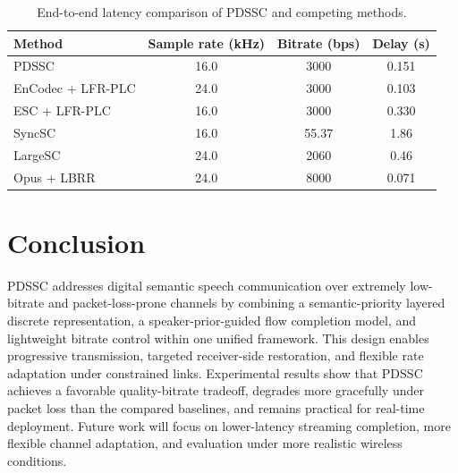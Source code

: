 \documentclass[conference]{IEEEtran}
\begin{document}
\begin{table}[!t]
\caption{End-to-end latency comparison of PDSSC and competing methods.}
\label{tab:latency}
\centering
\begin{tabular}{lccc}
\hline
Method & Sample rate (kHz) & Bitrate (bps) & Delay (s) \\
\hline
PDSSC & 16.0 & 3000 & 0.151 \\
EnCodec + LFR-PLC & 24.0 & 3000 & 0.103 \\
ESC + LFR-PLC & 16.0 & 3000 & 0.330 \\
SyncSC & 16.0 & 55.37 & 1.86 \\
LargeSC & 24.0 & 2060 & 0.46 \\
Opus + LBRR & 24.0 & 8000 & 0.071 \\
\hline
\end{tabular}
\end{table}

\section{Conclusion}
PDSSC addresses digital semantic speech communication over extremely low-bitrate and packet-loss-prone channels by combining a semantic-priority layered discrete representation, a speaker-prior-guided flow completion model, and lightweight bitrate control within one unified framework. This design enables progressive transmission, targeted receiver-side restoration, and flexible rate adaptation under constrained links. Experimental results show that PDSSC achieves a favorable quality-bitrate tradeoff, degrades more gracefully under packet loss than the compared baselines, and remains practical for real-time deployment. Future work will focus on lower-latency streaming completion, more flexible channel adaptation, and evaluation under more realistic wireless conditions.
\end{document}
